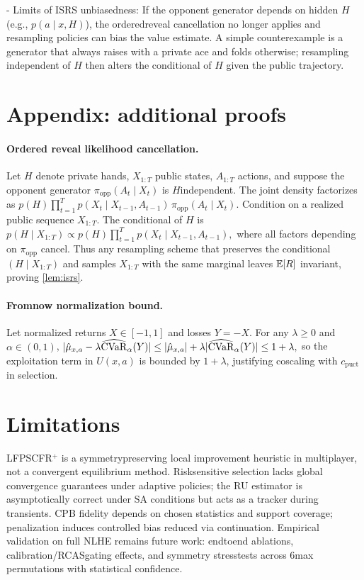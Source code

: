 - Limits of IS\textendash RS unbiasedness: If the opponent generator depends on hidden $H$ (e.g., $p(a\mid x,H)$), the ordered\textendash reveal cancellation no longer applies and resampling policies can bias the value estimate. A simple counterexample is a generator that always raises with a private ace and folds otherwise; resampling independent of $H$ then alters the conditional of $H$ given the public trajectory.

\section{Appendix: additional proofs}
\paragraph{Ordered reveal likelihood cancellation.}
Let $H$ denote private hands, $X_{1:T}$ public states, $A_{1:T}$ actions, and suppose the opponent generator $\pi_{\mathrm{opp}}(A_t\mid X_t)$ is $H$\textendash independent. The joint density factorizes as
$
p(H)\prod_{t=1}^T p(X_t\mid X_{t-1},A_{t-1})\,\pi_{\mathrm{opp}}(A_t\mid X_t).
$
Condition on a realized public sequence $X_{1:T}$. The conditional of $H$ is
$
p(H\mid X_{1:T}) \propto p(H)\prod_{t=1}^T p(X_t\mid X_{t-1},A_{t-1}),
$
where all factors depending on $\pi_{\mathrm{opp}}$ cancel. Thus any resampling scheme that preserves the conditional $(H\mid X_{1:T})$ and samples $X_{1:T}$ with the same marginal leaves $\mathbb{E}[R]$ invariant, proving \cref{lem:isrs}.

\paragraph{From\textendash now normalization bound.}
Let normalized returns $X\in[-1,1]$ and losses $Y=-X$. For any $\lambda\ge 0$ and $\alpha\in(0,1)$,
$
|\hat\mu_{x,a}-\lambda \widehat{\mathrm{CVaR}}_\alpha(Y)| \le |\hat\mu_{x,a}| + \lambda |\widehat{\mathrm{CVaR}}_\alpha(Y)| \le 1+\lambda,
$
so the exploitation term in $U(x,a)$ is bounded by $1+\lambda$, justifying co\textendash scaling with $c_{\text{puct}}$ in selection.

\section{Limitations}
LF\textendash PS\textendash CFR$^+$ is a symmetry\textendash preserving local improvement heuristic in multiplayer, not a convergent equilibrium method. Risk\textendash sensitive selection lacks global convergence guarantees under adaptive policies; the RU estimator is asymptotically correct under SA conditions but acts as a tracker during transients. CPB fidelity depends on chosen statistics and support coverage; penalization induces controlled bias reduced via continuation. Empirical validation on full NLHE remains future work: end\textendash to\textendash end ablations, calibration/RCAS\textendash gating effects, and symmetry stress\textendash tests across 6\textendash max permutations with statistical confidence.

